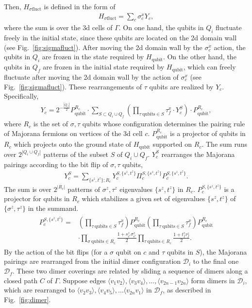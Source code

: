 \documentclass[12pt]{article}
\numberwithin{equation}{section}
\begin{document}
Then, $H_{\sigma\mathrm{fluct}}$ is defined in the form of
\begin{align}
    H_{\sigma\mathrm{fluct}}=\sum_{c}\sigma_c^xY_c,
\end{align}
where the sum is over the 3d cells of $\Gamma$. 
On one hand, the qubits in $Q_{i}$ fluctuate freely in the initial state, since these qubits are located on the 2d domain wall (see Fig.~\ref{fig:sigmafluct}). After moving the 2d domain wall by the $\sigma_c^x$ action, the qubits in $Q_{i}$ are frozen in the state required by $H_{\mathrm{qubit}}$. 
On the other hand, the qubits in $Q_{f}$ are frozen in the initial state required by $H_{\mathrm{qubit}}$, which can freely fluctuate after moving the 2d domain wall by the action of $\sigma_c^x$ (see Fig.~\ref{fig:sigmafluct}). 
These rearrangements of $\tau$ qubits are realized by $Y_c$. Specifically, 
\begin{align}
    Y_c=2^{-\frac{|Q_f|}{2}}P_{\mathrm{qubit}}^{R_c}\cdot\sum_{S\subset Q_i\cup Q_f}\left(\prod_{\tau\ \mathrm{qubits}\in S}\tau_f^x\cdot Y_c^S\right)\cdot P_{\mathrm{qubit}}^{R_c},
\end{align}
where $R_c$ is the set of $\sigma, \tau$ qubits whose configuration determines the pairing rule of Majorana fermions on vertices of the 3d cell $c$. $P_{\mathrm{qubit}}^{R_c}$ is a projector of qubits in $R_c$ which projects onto the ground state of $H_{\mathrm{qubit}}$ supported on $R_c$. 
The sum runs over $2^{|Q_i\cup Q_f|}$ patterns of the subset $S$ of $Q_i\cup Q_f$. $Y_c^S$ rearranges the Majorana pairings according to the bit flip of $\sigma, \tau$ qubits,
\begin{align}
    Y_c^S=\sum_{\{s^z,t^z\};R_c}Y_c^{S,\{s^z,t^z\}}\Pi_c^{S,\{s^z,t^z\}}P_c^{S,\{s^z,t^z\}}.
\end{align}
The sum is over $2^{|R_c|}$ patterns of $\sigma^z, \tau^z$ eigenvalues $\{s^z,t^z\}$ in $R_c$.  $P_{c}^{S,\{s^z,t^z\}}$ is a projector for qubits in $R_c$ which stabilizes a given set of eigenvalues $\{s^z, t^z\}$ of $\{\sigma^z,\tau^z\}$ in the summand.
\begin{align}
\begin{split}
    P_c^{S,\{s^z,t^z\}}=&\left(\prod_{\tau\ \mathrm{qubits}\in S}\tau_f^x\right)P_{\mathrm{qubit}}^{R_c}\left(\prod_{\tau\ \mathrm{qubits}\in S}\tau_f^x\right) P_{\mathrm{qubit}}^{R_c} \\
    &\cdot\prod_{\sigma\ \mathrm{qubits}\in R_c}
    \frac{1+s^z_{c'}\sigma^z_{c'}}{2}\prod_{\tau\ \mathrm{qubits}\in R_c}
    \frac{1+t^z_{f}\tau^z_{f}}{2}.
    \end{split}
\end{align}
By the action of the bit flips (for a $\sigma$ qubit on $c$ and $\tau$ qubits in $S$), the Majorana pairings are rearranged from the initial dimer configuration $\mathcal{D}_i$ to the final one $\mathcal{D}_f$. These two dimer coverings are related by sliding a sequence of dimers along a closed path $C$ of $\Gamma$. 
Suppose edges $\langle v_1v_2\rangle, \langle v_3v_4\rangle, \dots,\langle v_{2n-1}v_{2n}\rangle$ form dimers in $\mathcal{D}_i$, which are rearranged to $\langle v_2v_3\rangle, \langle v_4v_5\rangle, \dots\langle v_{2n}v_{1}\rangle$ in $\mathcal{D}_f$, as described in Fig.~\ref{fig:dimer}. 
\end{document}
